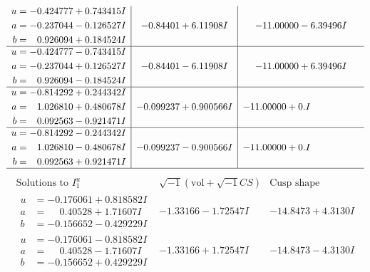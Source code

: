 \documentclass[1p]{elsarticle_modified}
\theoremstyle{definition}
\newcommand{\I}{\sqrt{-1}}
\begin{document}
$$\begin{array}{c|c|c}
\begin{aligned}
u &= -0.424777 + 0.743415 I \\
a &= -0.237044 - 0.126527 I \\
b &= \phantom{-}0.926094 + 0.184524 I\end{aligned}
 & -0.84401 + 6.11908 I & -11.00000 - 6.39496 I \\ \hline\begin{aligned}
u &= -0.424777 - 0.743415 I \\
a &= -0.237044 + 0.126527 I \\
b &= \phantom{-}0.926094 - 0.184524 I\end{aligned}
 & -0.84401 - 6.11908 I & -11.00000 + 6.39496 I \\ \hline\begin{aligned}
u &= -0.814292 + 0.244342 I \\
a &= \phantom{-}1.026810 + 0.480678 I \\
b &= \phantom{-}0.092563 - 0.921471 I\end{aligned}
 & -0.099237 + 0.900566 I & -11.00000 + 0. I\phantom{ +0.000000I} \\ \hline\begin{aligned}
u &= -0.814292 - 0.244342 I \\
a &= \phantom{-}1.026810 - 0.480678 I \\
b &= \phantom{-}0.092563 + 0.921471 I\end{aligned}
 & -0.099237 - 0.900566 I & -11.00000 + 0. I\phantom{ +0.000000I}\\
 \hline 
 \end{array}$$\newpage$$\begin{array}{c|c|c}  
\text{Solutions to }I^u_{1}& \I (\text{vol} + \sqrt{-1}CS) & \text{Cusp shape}\\
 \hline 
\begin{aligned}
u &= -0.176061 + 0.818582 I \\
a &= \phantom{-}0.40528 + 1.71607 I \\
b &= -0.156652 - 0.429229 I\end{aligned}
 & -1.33166 - 1.72547 I & -14.8473 + 4.3130 I \\ \hline\begin{aligned}
u &= -0.176061 - 0.818582 I \\
a &= \phantom{-}0.40528 - 1.71607 I \\
b &= -0.156652 + 0.429229 I\end{aligned}
 & -1.33166 + 1.72547 I & -14.8473 - 4.3130 I \\ \hline\begin{aligned}

\end{aligned}
\end{array}$$
\end{document}
